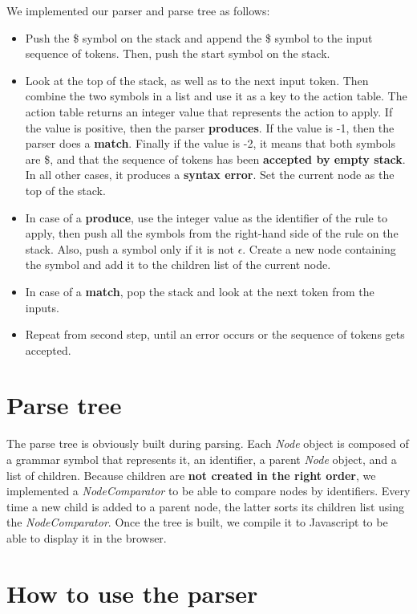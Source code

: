 We implemented our parser and parse tree as follows:
\begin{itemize}
  \item Push the \$ symbol on the stack and append the \$ symbol to the input sequence of tokens. Then, push the start symbol 
        on the stack.
  \item Look at the top of the stack, as well as to the next input token. Then combine the two symbols in a list and use it as a key to the
        action table. The action table returns an integer value that represents the action to apply. If the value is positive, then the parser 
        \textbf{produces}. If the value is -1, then the parser does a \textbf{match}. Finally if the value is -2, it means that both symbols
        are \$, and that the sequence of tokens has been \textbf{accepted by empty stack}. In all other cases, it produces a \textbf{syntax error}.
        Set the current node as the top of the stack.
  \item In case of a \textbf{produce}, use the integer value as the identifier of the rule to apply, then push all the symbols from the 
        right-hand side of the rule on the stack. Also, push a symbol only if it is not $\epsilon$. Create a new node containing the symbol
        and add it to the children list of the current node.
  \item In case of a \textbf{match}, pop the stack and look at the next token from the inputs.
  \item Repeat from second step, until an error occurs or the sequence of tokens gets accepted.
\end{itemize}

\section{Parse tree}

The parse tree is obviously built during parsing. Each \textit{Node} object is composed of a grammar symbol that represents it,
an identifier, a parent \textit{Node} object, and a list of children. Because children are \textbf{not created in the right order},
we implemented a \textit{NodeComparator} to be able to compare nodes by identifiers. Every time a new child is added to a parent node,
the latter sorts its children list using the \textit{NodeComparator}. Once the tree is built, we compile it to Javascript to be able
to display it in the browser.

\section{How to use the parser}

